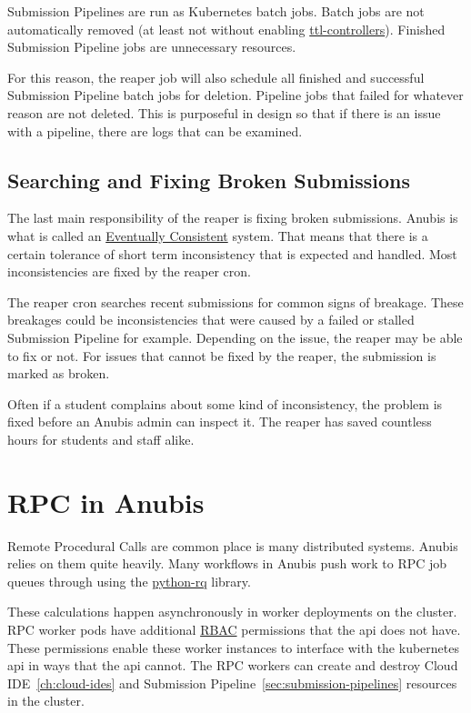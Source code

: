 Submission Pipelines are run as Kubernetes batch jobs.
Batch jobs are not automatically removed (at least not without enabling
\href{https://kubernetes.io/docs/concepts/workloads/controllers/ttlafterfinished/}{ttl-controllers}).
Finished Submission Pipeline jobs are unnecessary resources.

For this reason, the reaper job will also schedule all finished and successful Submission Pipeline batch jobs
for deletion.
Pipeline jobs that failed for whatever reason are not deleted.
This is purposeful in design so that if there is an issue with a pipeline,
there are logs that can be examined.

\subsection{Searching and Fixing Broken Submissions}\label{subsec:reaping-fixing}

The last main responsibility of the reaper is fixing broken submissions.
Anubis is what is called an \href{https://en.wikipedia.org/wiki/Eventual_consistency}{Eventually Consistent}
system.
That means that there is a certain tolerance of short term inconsistency that is expected and
handled.
Most inconsistencies are fixed by the reaper cron.

The reaper cron searches recent submissions for common signs of breakage.
These breakages could be inconsistencies that were caused by a failed or stalled Submission Pipeline
for example.
Depending on the issue, the reaper may be able to fix or not.
For issues that cannot be fixed by the reaper, the submission is marked as broken.

Often if a student complains about some kind of inconsistency, the problem is fixed
before an Anubis admin can inspect it.
The reaper has saved countless hours for students and staff alike.

\section{RPC in Anubis}\label{sec:rpc-in-anubis}

Remote Procedural Calls are common place is many distributed systems.
Anubis relies on them quite heavily.
Many workflows in Anubis push work to RPC job queues through using the
\href{https://python-rq.org}{python-rq} library.

These calculations happen asynchronously in worker deployments on the cluster.
RPC worker pods have additional \href{https://kubernetes.io/docs/reference/access-authn-authz/rbac/}{RBAC}
permissions that the api does not have.
These permissions enable these worker instances to interface with the kubernetes api in ways
that the api cannot.
The RPC workers can create and destroy Cloud IDE~\ref{ch:cloud-ides}
and Submission Pipeline~\ref{sec:submission-pipelines} resources in the cluster.

